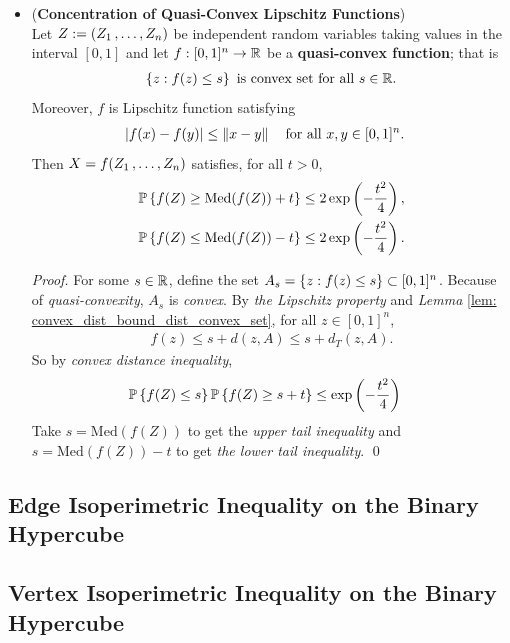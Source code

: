 \documentclass[11pt]{article}
\begin{document}
\begin{itemize}
\item \begin{theorem} (\textbf{Concentration of Quasi-Convex Lipschitz Functions}) \citep{boucheron2013concentration}\\
Let  $Z:= (Z_1 \,{,}\ldots{,}\, Z_{n})$ be independent random variables taking values in the interval $[0, 1]$ and let $f : [0, 1]^n \to {\mathbb R}$ be a \textbf{quasi-convex function}; that is
\begin{align*}
\left\{z: f(z) \le s\right\} \text{ is convex set for all }s \in {\mathbb R}. 
\end{align*} Moreover, $f$ is Lipschitz function satisfying
\begin{align*}
\left\lvert f(x) - f(y) \right\rvert &\le \left\|x - y\right\|_{} \quad \text{for all }x, y \in [0, 1]^n.
\end{align*}
Then $X = f(Z_1 \,{,}\ldots{,}\, Z_{n})$ satisfies, for all $t > 0$,
\begin{align}
{\mathbb P}\left\{f(Z)  \ge  \text{Med}(f(Z)) + t \right\} &\le 2\exp\left(- \frac{t^2}{4}\right), \label{ineqn: convex_lipschitz_concentration_med} \\
{\mathbb P}\left\{f(Z)  \le \text{Med}(f(Z)) -t \right\} &\le 2\exp\left(- \frac{t^2}{4}\right). \nonumber
\end{align}
\end{theorem}
\begin{proof}
For some $s \in {\mathbb R}$, define the set $A_s = \left\{z : f(z) \le s\right\} \subset [0, 1]^n$.  Because of \emph{quasi-convexity}, $A_s$ is \emph{convex}.  By \emph{the Lipschitz property} and \emph{Lemma} \ref{lem: convex_dist_bound_dist_convex_set}, for all $z \in [0, 1]^n$,
\begin{align*}
f(z) \le s +  d(z, A) \le s + d_{T}(z, A).
\end{align*} So by \emph{convex distance inequality}, 
\begin{align*}
{\mathbb P}\left\{f(Z) \le s\right\} {\mathbb P}\left\{f(Z) \ge s + t\right\} &\le \exp\left(- \frac{t^2}{4}\right)
\end{align*} Take $s = \text{Med}(f(Z))$ to get the \emph{upper tail inequality} and $s = \text{Med}(f(Z)) - t$ to get \emph{the lower tail inequality}. \qed
\end{proof}
\end{itemize}

\subsection{Edge Isoperimetric Inequality on the Binary Hypercube}
\subsection{Vertex Isoperimetric Inequality on the Binary Hypercube}







\newpage


\end{document}
